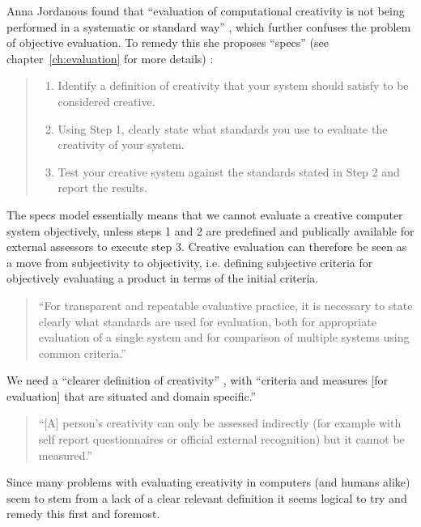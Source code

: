 Anna Jordanous found that ``evaluation of computational creativity is not being performed in a systematic or standard way'' \autocite[p.2]{Jordanous2011}, which further confuses the problem of objective evaluation. To remedy this she proposes ``\gls{specs}'' (see chapter~\ref{ch:evaluation} for more details) \autocite[p.137-140]{Jordanous2012a}:

\begin{quote}
  \begin{enumerate}
    \item Identify a definition of creativity that your system should satisfy to be considered creative.
    \item Using Step 1, clearly state what standards you use to evaluate the creativity of your system.
    \item Test your creative system against the standards stated in Step 2 and report the results.
  \end{enumerate}
\end{quote}

The \gls{specs} model essentially means that we cannot evaluate a creative computer system objectively, unless steps 1 and 2 are predefined and publically available for external assessors to execute step 3. Creative evaluation can therefore be seen as a move from subjectivity to objectivity, i.e. defining subjective criteria for objectively evaluating a product in terms of the initial criteria.

\begin{quote}
  ``For transparent and repeatable evaluative practice, it is necessary to state clearly what standards are used for evaluation, both for appropriate evaluation of a single system and for comparison of multiple systems using common criteria.'' \autocite[p.67]{Jordanous2012a}
\end{quote}

We need a ``clearer definition of creativity'' \autocite[p.459]{Mayer1999}, with ``criteria and measures [for evaluation] that are situated and domain specific.'' \autocite[p.7]{Candy2012}

\begin{quote}
  ``[A] person's creativity can only be assessed indirectly (for example with self report questionnaires or official external recognition) but it cannot be measured.'' \autocite[p.258]{Piffer2012}
\end{quote}

Since many problems with evaluating creativity in computers (and humans alike) seem to stem from a lack of a clear relevant definition it seems logical to try and remedy this first and foremost.


